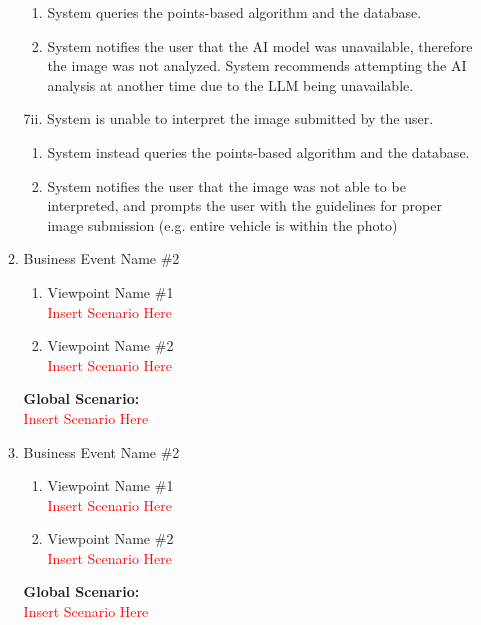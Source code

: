 \documentclass[]{article}
\begin{document}
\begin{enumerate}
\begin{enumerate}[{\bf {BE}1.}]
		\begin{enumerate}[{7i}.1]
			\item System queries the points-based algorithm and the database.
			\item System notifies the user that the AI model was unavailable, therefore the image was not analyzed.
			System recommends attempting the AI analysis at another time due to the LLM being unavailable. 
		\end{enumerate}
		7ii. System is unable to interpret the image submitted by the user.
		\begin{enumerate}[{7ii}.1]
			\item System instead queries the points-based algorithm and the database.
			\item System notifies the user that the image was not able to be interpreted, and prompts the user with the guidelines for proper image submission (e.g. entire vehicle is within the photo)
		\end{enumerate}

	\item Business Event Name \#2
	\begin{enumerate}[{\bf VP1.}]
		\item Viewpoint Name \#1 \\
		\textcolor{red}{Insert Scenario Here}
		\item Viewpoint Name \#2 \\
		\textcolor{red}{Insert Scenario Here}
	\end{enumerate}
	{\bf Global Scenario:}\\
	\textcolor{red}{Insert Scenario Here}

	\item Business Event Name \#2
	\begin{enumerate}[{\bf VP1.}]
		\item Viewpoint Name \#1 \\
		\textcolor{red}{Insert Scenario Here}
		\item Viewpoint Name \#2 \\
		\textcolor{red}{Insert Scenario Here}
	\end{enumerate}
	{\bf Global Scenario:}\\
	\textcolor{red}{Insert Scenario Here}


\end{enumerate}
\end{enumerate}
\end{document}
